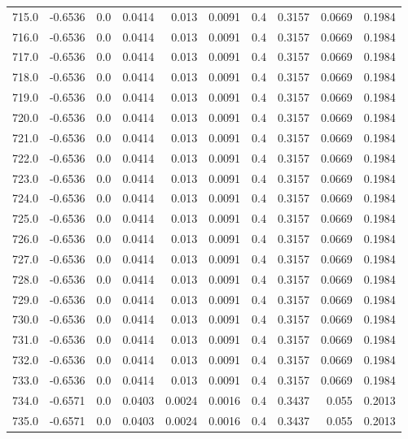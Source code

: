 \begin{longtable}{lrrrrrrrrr}
715.0 & -0.6536 & 0.0 & 0.0414 & 0.013 & 0.0091 & 0.4 & 0.3157 & 0.0669 & 0.1984 \\
716.0 & -0.6536 & 0.0 & 0.0414 & 0.013 & 0.0091 & 0.4 & 0.3157 & 0.0669 & 0.1984 \\
717.0 & -0.6536 & 0.0 & 0.0414 & 0.013 & 0.0091 & 0.4 & 0.3157 & 0.0669 & 0.1984 \\
718.0 & -0.6536 & 0.0 & 0.0414 & 0.013 & 0.0091 & 0.4 & 0.3157 & 0.0669 & 0.1984 \\
719.0 & -0.6536 & 0.0 & 0.0414 & 0.013 & 0.0091 & 0.4 & 0.3157 & 0.0669 & 0.1984 \\
720.0 & -0.6536 & 0.0 & 0.0414 & 0.013 & 0.0091 & 0.4 & 0.3157 & 0.0669 & 0.1984 \\
721.0 & -0.6536 & 0.0 & 0.0414 & 0.013 & 0.0091 & 0.4 & 0.3157 & 0.0669 & 0.1984 \\
722.0 & -0.6536 & 0.0 & 0.0414 & 0.013 & 0.0091 & 0.4 & 0.3157 & 0.0669 & 0.1984 \\
723.0 & -0.6536 & 0.0 & 0.0414 & 0.013 & 0.0091 & 0.4 & 0.3157 & 0.0669 & 0.1984 \\
724.0 & -0.6536 & 0.0 & 0.0414 & 0.013 & 0.0091 & 0.4 & 0.3157 & 0.0669 & 0.1984 \\
725.0 & -0.6536 & 0.0 & 0.0414 & 0.013 & 0.0091 & 0.4 & 0.3157 & 0.0669 & 0.1984 \\
726.0 & -0.6536 & 0.0 & 0.0414 & 0.013 & 0.0091 & 0.4 & 0.3157 & 0.0669 & 0.1984 \\
727.0 & -0.6536 & 0.0 & 0.0414 & 0.013 & 0.0091 & 0.4 & 0.3157 & 0.0669 & 0.1984 \\
728.0 & -0.6536 & 0.0 & 0.0414 & 0.013 & 0.0091 & 0.4 & 0.3157 & 0.0669 & 0.1984 \\
729.0 & -0.6536 & 0.0 & 0.0414 & 0.013 & 0.0091 & 0.4 & 0.3157 & 0.0669 & 0.1984 \\
730.0 & -0.6536 & 0.0 & 0.0414 & 0.013 & 0.0091 & 0.4 & 0.3157 & 0.0669 & 0.1984 \\
731.0 & -0.6536 & 0.0 & 0.0414 & 0.013 & 0.0091 & 0.4 & 0.3157 & 0.0669 & 0.1984 \\
732.0 & -0.6536 & 0.0 & 0.0414 & 0.013 & 0.0091 & 0.4 & 0.3157 & 0.0669 & 0.1984 \\
733.0 & -0.6536 & 0.0 & 0.0414 & 0.013 & 0.0091 & 0.4 & 0.3157 & 0.0669 & 0.1984 \\
734.0 & -0.6571 & 0.0 & 0.0403 & 0.0024 & 0.0016 & 0.4 & 0.3437 & 0.055 & 0.2013 \\
735.0 & -0.6571 & 0.0 & 0.0403 & 0.0024 & 0.0016 & 0.4 & 0.3437 & 0.055 & 0.2013 \\

\end{longtable}
